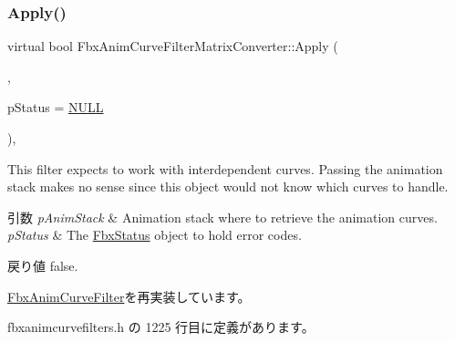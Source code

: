 \subsubsection{\texorpdfstring{Apply()}{Apply()}\hspace{0.1cm}{\footnotesize\ttfamily [2/7]}}
{\footnotesize\ttfamily virtual bool Fbx\+Anim\+Curve\+Filter\+Matrix\+Converter\+::\+Apply (\begin{DoxyParamCaption}\item[{\hyperlink{class_fbx_anim_stack}{Fbx\+Anim\+Stack} $\ast$}]{,  }\item[{\hyperlink{class_fbx_status}{Fbx\+Status} $\ast$}]{p\+Status = {\ttfamily \hyperlink{fbxarch_8h_a070d2ce7b6bb7e5c05602aa8c308d0c4}{N\+U\+LL}} }\end{DoxyParamCaption})\hspace{0.3cm}{\ttfamily [inline]}, {\ttfamily [virtual]}}

This filter expects to work with interdependent curves. Passing the animation stack makes no sense since this object would not know which curves to handle. 
\begin{DoxyParams}{引数}
{\em p\+Anim\+Stack} & Animation stack where to retrieve the animation curves. \\
\hline
{\em p\+Status} & The \hyperlink{class_fbx_status}{Fbx\+Status} object to hold error codes. \\
\hline
\end{DoxyParams}
\begin{DoxyReturn}{戻り値}
{\ttfamily false}. 
\end{DoxyReturn}


\hyperlink{class_fbx_anim_curve_filter_aef3900e6180e05661c27ee484ae939c3}{Fbx\+Anim\+Curve\+Filter}を再実装しています。



 fbxanimcurvefilters.\+h の 1225 行目に定義があります。

\mbox{\label{class_fbx_anim_curve_filter_matrix_converter_a9159d911dfa550f7760ffbb1e3b6cb6b}} 
